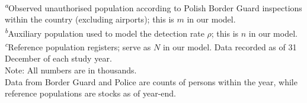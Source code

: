 \begin{table}[H]
\begin{tabular*}{\linewidth}{@{\extracolsep{\fill}}rrrrrr}
\bottomrule
\end{tabular*}
\begin{minipage}{\linewidth}
\vspace{.05em}
\textsuperscript{\textit{a}}Observed unauthorised population according to Polish Border Guard inspections within the country (excluding airports); this is $m$ in our model.\\
\textsuperscript{\textit{b}}Auxiliary population used to model the detection rate $\rho$; this is $n$ in our model.\\
\textsuperscript{\textit{c}}Reference population registers; serve as $N$ in our model. Data recorded as of 31 December of each study year.\\
Note: All numbers are in thousands.\\
Data from Border Guard and Police are counts of persons within the year, while reference populations are stocks as of year-end.\\
\end{minipage}
\end{table}

